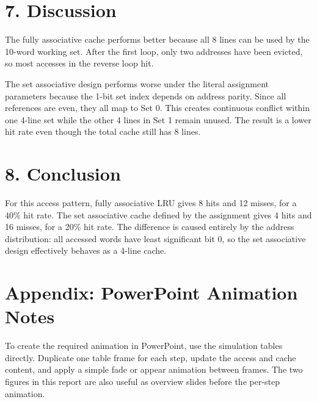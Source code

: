 \documentclass{article}
\begin{document}
\section*{7. Discussion}
The fully associative cache performs better because all 8 lines can be used by the 10-word working set. After the first loop, only two addresses have been evicted, so most accesses in the reverse loop hit.

The set associative design performs worse under the literal assignment parameters because the 1-bit set index depends on address parity. Since all references are even, they all map to Set 0. This creates continuous conflict within one 4-line set while the other 4 lines in Set 1 remain unused. The result is a lower hit rate even though the total cache still has 8 lines.

\section*{8. Conclusion}
For this access pattern, fully associative LRU gives 8 hits and 12 misses, for a 40\% hit rate. The set associative cache defined by the assignment gives 4 hits and 16 misses, for a 20\% hit rate. The difference is caused entirely by the address distribution: all accessed words have least significant bit 0, so the set associative design effectively behaves as a 4-line cache.

\section*{Appendix: PowerPoint Animation Notes}
To create the required animation in PowerPoint, use the simulation tables directly. Duplicate one table frame for each step, update the access and cache content, and apply a simple fade or appear animation between frames. The two figures in this report are also useful as overview slides before the per-step animation.
\end{document}
